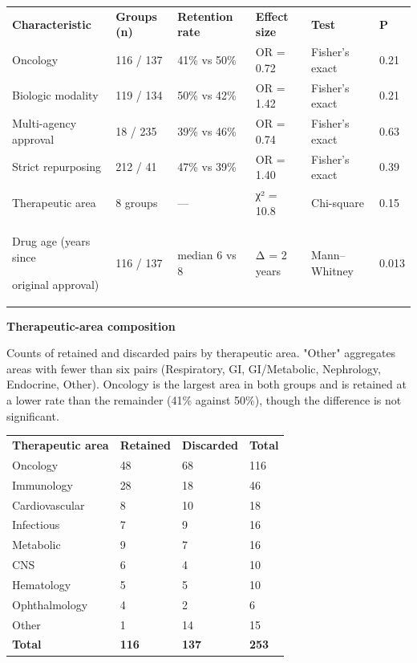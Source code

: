 \begin{longtable}[]{@{}llllll@{}}
\toprule
\endhead
\textbf{Characteristic} & \textbf{Groups (n)} & \textbf{Retention rate} & \textbf{Effect size} & \textbf{Test} & \textbf{P}\tabularnewline
Oncology & 116 / 137 & 41\% vs 50\% & OR = 0.72 & Fisher's exact & 0.21\tabularnewline
Biologic modality & 119 / 134 & 50\% vs 42\% & OR = 1.42 & Fisher's exact & 0.21\tabularnewline
Multi-agency approval & 18 / 235 & 39\% vs 46\% & OR = 0.74 & Fisher's exact & 0.63\tabularnewline
Strict repurposing & 212 / 41 & 47\% vs 39\% & OR = 1.40 & Fisher's exact & 0.39\tabularnewline
Therapeutic area & 8 groups & --- & χ² = 10.8 & Chi-square & 0.15\tabularnewline
\begin{minipage}[t]{0.14\columnwidth}\raggedright
Drug age (years since

original approval)\strut
\end{minipage} & \begin{minipage}[t]{0.14\columnwidth}\raggedright
116 / 137\strut
\end{minipage} & \begin{minipage}[t]{0.14\columnwidth}\raggedright
median 6 vs 8\strut
\end{minipage} & \begin{minipage}[t]{0.14\columnwidth}\raggedright
Δ = 2 years\strut
\end{minipage} & \begin{minipage}[t]{0.14\columnwidth}\raggedright
Mann--Whitney\strut
\end{minipage} & \begin{minipage}[t]{0.14\columnwidth}\raggedright
0.013\strut
\end{minipage}\tabularnewline
\bottomrule
\end{longtable}

\textbf{Therapeutic-area composition}

Counts of retained and discarded pairs by therapeutic area. "Other" aggregates areas with fewer than six pairs (Respiratory, GI, GI/Metabolic, Nephrology, Endocrine, Other). Oncology is the largest area in both groups and is retained at a lower rate than the remainder (41\% against 50\%), though the difference is not significant.

\begin{longtable}[]{@{}llll@{}}
\toprule
\endhead
\textbf{Therapeutic area} & \textbf{Retained} & \textbf{Discarded} & \textbf{Total}\tabularnewline
Oncology & 48 & 68 & 116\tabularnewline
Immunology & 28 & 18 & 46\tabularnewline
Cardiovascular & 8 & 10 & 18\tabularnewline
Infectious & 7 & 9 & 16\tabularnewline
Metabolic & 9 & 7 & 16\tabularnewline
CNS & 6 & 4 & 10\tabularnewline
Hematology & 5 & 5 & 10\tabularnewline
Ophthalmology & 4 & 2 & 6\tabularnewline
Other & 1 & 14 & 15\tabularnewline
\textbf{Total} & \textbf{116} & \textbf{137} & \textbf{253}\tabularnewline
\bottomrule
\end{longtable}
